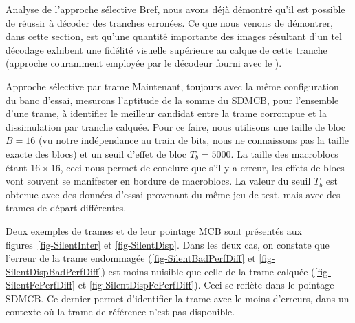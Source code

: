 \begin{section}{Analyse de l'approche sélective}
Bref, nous avons déjà démontré qu'il est possible de réussir à décoder des
tranches erronées. Ce que nous venons de démontrer, dans cette section, est
qu'une quantité importante des images résultant d'un tel décodage exhibent une
fidélité visuelle supérieure au calque de cette tranche (approche couramment
employée par le décodeur fourni avec le \ltCodec).

\FloatBarrier
\begin{subsection}{Approche sélective par trame} \label{sec-AnalyseSDMCB}
Maintenant, toujours avec la même configuration du banc d'essai, mesurons
l'aptitude de la somme du SDMCB, pour l'ensemble d'une trame, à identifier le
meilleur candidat entre la trame corrompue et la dissimulation par tranche
calquée. Pour ce faire, nous utilisons une taille de bloc $B=16$ (vu notre
indépendance au train de bits, nous ne connaissons pas la taille exacte des
blocs) et un seuil d'effet de bloc $T_b = 5000$. La taille des macroblocs étant
$16\times 16$, ceci nous permet de conclure que s'il y a erreur, les effets de
blocs vont souvent se manifester en bordure de macroblocs. La valeur du seuil
$T_b$ est obtenue avec des données d'essai provenant du même jeu de test, mais
avec des trames de départ différentes.

Deux exemples de trames et de leur pointage MCB sont présentés aux
figures~\ref{fig-SilentInter} et \ref{fig-SilentDisp}. Dans les deux cas, on
constate que l'erreur de la trame endommagée (\ref{fig-SilentBadPerfDiff} et
\ref{fig-SilentDispBadPerfDiff}) est moins nuisible que celle de la trame
calquée (\ref{fig-SilentFcPerfDiff} et \ref{fig-SilentDispFcPerfDiff}). Ceci se
reflète dans le pointage SDMCB. Ce dernier permet d'identifier la trame avec le
moins d'erreurs, dans un contexte où la trame de référence n'est pas disponible.


\end{subsection}
\end{section}
